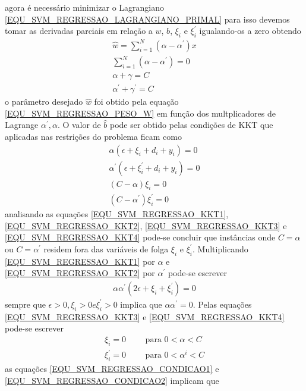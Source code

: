 agora é necessário minimizar o Lagrangiano \eqref{EQU_SVM_REGRESSAO_LAGRANGIANO_PRIMAL} para isso devemos tomar as derivadas parciais em relação a \(w\), \(b\), \(\xi_{i}\) e \(\xi_{i}^{'}\) igualando-os a zero obtendo
\begin{align}
\hat{w} = \sum\limits_{i=1}^{N} (\alpha - \alpha^{'})x \label{EQU_SVM_REGRESSAO_PESO_W} \\
\sum\limits_{i=1}^{N} (\alpha - \alpha^{'}) = 0\\
\alpha + \gamma = C\\
\alpha^{'} + \gamma^{'} = C
\end{align}
o parâmetro desejado \(\hat{w}\) foi obtido pela equação \eqref{EQU_SVM_REGRESSAO_PESO_W} em função dos multplicadores de Lagrange \(\alpha^{'}, \alpha\). O valor de \(\hat{b}\) pode ser obtido pelas condições de KKT que aplicadas nas restrições do problema ficam como
\begin{align}
\alpha(\epsilon + \xi_{i} + d_{i} + y_{i}) = 0 \label{EQU_SVM_REGRESSAO_KKT1}\\
\alpha^{'}(\epsilon + \xi_{i}^{'} + d_{i} + y_{i}) = 0 \label{EQU_SVM_REGRESSAO_KKT2}\\
(C-\alpha)\xi_{i} = 0 \label{EQU_SVM_REGRESSAO_KKT3}\\
(C-\alpha^{'})\xi_{i}^{'} = 0 \label{EQU_SVM_REGRESSAO_KKT4}
\end{align}
analisando as equações \eqref{EQU_SVM_REGRESSAO_KKT1}, \eqref{EQU_SVM_REGRESSAO_KKT2}, \eqref{EQU_SVM_REGRESSAO_KKT3} e \eqref{EQU_SVM_REGRESSAO_KKT4} pode-se concluir que instâncias onde \(C=\alpha\) ou \(C=\alpha^{'}\) residem fora das variáveis de folga \(\xi_{i}\) e \(\xi_{i}^{'}\). Multiplicando \eqref{EQU_SVM_REGRESSAO_KKT1} por \(\alpha\) e \eqref{EQU_SVM_REGRESSAO_KKT2} por \(\alpha^{'}\) pode-se escrever
\begin{align}
\alpha\alpha^{'}(2\epsilon + \xi_{i} + \xi_{i}^{'})=0
\end{align}
sempre que \(\epsilon > 0, \xi_{i} > 0 e \xi_{i}^{'} > 0\) implica que \(\alpha\alpha^{'} = 0\). Pelas equações \eqref{EQU_SVM_REGRESSAO_KKT3} e \eqref{EQU_SVM_REGRESSAO_KKT4} pode-se escrever
\begin{align}
\xi_{i}  = 0		\qquad \textrm{ para } 0 < \alpha < C		\label{EQU_SVM_REGRESSAO_CONDICAO1}\\
\xi_{i}^{'} = 0		\qquad \textrm{ para }  0 < \alpha^{i} < C	\label{EQU_SVM_REGRESSAO_CONDICAO2}
\end{align}
as equações \eqref{EQU_SVM_REGRESSAO_CONDICAO1} e \eqref{EQU_SVM_REGRESSAO_CONDICAO2} implicam que  
